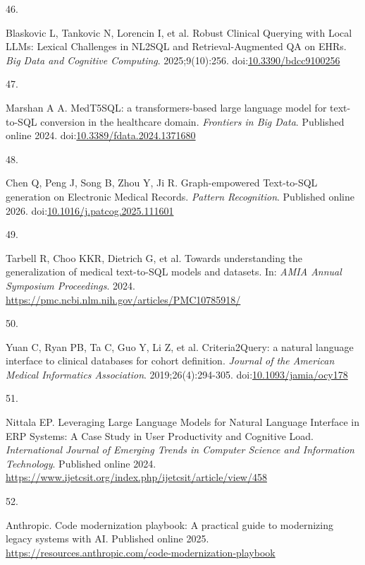 \documentclass[
  american,
  11pt,
  letterpaper,
  oneside  ,captions=tableheading
]{scrartcl}
\newlength{\cslhangindent}
\newlength{\csllabelwidth}
\newenvironment{CSLReferences}[2] %
 {\begin{list}{}{%
  \setlength{\itemindent}{0pt}
  \setlength{\leftmargin}{0pt}
  \setlength{\parsep}{0pt}
  \ifodd #1
   \setlength{\leftmargin}{\cslhangindent}
   \setlength{\itemindent}{-1\cslhangindent}
  \fi
  \setlength{\itemsep}{#2\baselineskip}}}
 {\end{list}}
\newcommand{\CSLLeftMargin}[1]{\parbox[t]{\csllabelwidth}{\strut#1\strut}}
\newcommand{\CSLRightInline}[1]{\parbox[t]{\linewidth - \csllabelwidth}{\strut#1\strut}}
\begin{document}
\begin{CSLReferences}{0}{1}
\CSLLeftMargin{46. }%
\CSLRightInline{{Blaskovic L, Tankovic N, Lorencin I, et al.} {Robust
Clinical Querying with Local LLMs: Lexical Challenges in NL2SQL and
Retrieval-Augmented QA on EHRs}. \emph{Big Data and Cognitive
Computing}. 2025;9(10):256.
doi:\href{https://doi.org/10.3390/bdcc9100256}{10.3390/bdcc9100256}}

\CSLLeftMargin{47. }%
\CSLRightInline{Marshan A A. {MedT5SQL: a transformers-based large
language model for text-to-SQL conversion in the healthcare domain}.
\emph{Frontiers in Big Data}. Published online 2024.
doi:\href{https://doi.org/10.3389/fdata.2024.1371680}{10.3389/fdata.2024.1371680}}

\CSLLeftMargin{48. }%
\CSLRightInline{Chen Q, Peng J, Song B, Zhou Y, Ji R. {Graph-empowered
Text-to-SQL generation on Electronic Medical Records}. \emph{Pattern
Recognition}. Published online 2026.
doi:\href{https://doi.org/10.1016/j.patcog.2025.111601}{10.1016/j.patcog.2025.111601}}

\CSLLeftMargin{49. }%
\CSLRightInline{{Tarbell R, Choo KKR, Dietrich G, et al.} {Towards
understanding the generalization of medical text-to-SQL models and
datasets}. In: \emph{AMIA Annual Symposium Proceedings}. 2024.
\url{https://pmc.ncbi.nlm.nih.gov/articles/PMC10785918/}}

\CSLLeftMargin{50. }%
\CSLRightInline{{Yuan C, Ryan PB, Ta C, Guo Y, Li Z, et al.}
{Criteria2Query: a natural language interface to clinical databases for
cohort definition}. \emph{Journal of the American Medical Informatics
Association}. 2019;26(4):294-305.
doi:\href{https://doi.org/10.1093/jamia/ocy178}{10.1093/jamia/ocy178}}

\CSLLeftMargin{51. }%
\CSLRightInline{Nittala EP. {Leveraging Large Language Models for
Natural Language Interface in ERP Systems: A Case Study in User
Productivity and Cognitive Load}. \emph{International Journal of
Emerging Trends in Computer Science and Information Technology}.
Published online 2024.
\url{https://www.ijetcsit.org/index.php/ijetcsit/article/view/458}}

\CSLLeftMargin{52. }%
\CSLRightInline{Anthropic. {Code modernization playbook: A practical
guide to modernizing legacy systems with {AI}}. Published online 2025.
\url{https://resources.anthropic.com/code-modernization-playbook}}


\end{CSLReferences}
\end{document}
